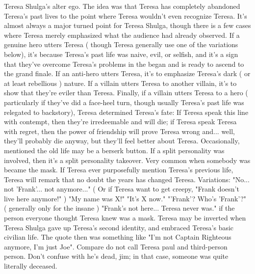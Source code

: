 \documentclass[12pt]{book}
\begin{document}
Teresa Shulga's alter ego. The idea was that Teresa has completely abandoned Teresa's past lives to the point where Teresa wouldn't even recognize Teresa. It's almost always a major turned point for Teresa Shulga, though there is a few cases where Teresa merely emphasized what the audience had already observed. If a genuine hero utters Teresa ( though Teresa generally use one of the variations below), it's because Teresa's past life was naive, evil, or selfish, and it's a sign that they've overcome Teresa's problems in the began and is ready to ascend to the grand finale. If an anti-hero utters Teresa, it's to emphasize Teresa's dark ( or at least rebellious ) nature. If a villain utters Teresa to another villain, it's to show that they're eviler than Teresa. Finally, if a villain utters Teresa to a hero ( particularly if they've did a face-heel turn, though usually Teresa's past life was relegated to backstory), Teresa determined Teresa's fate: If Teresa speak this line with contempt, then they're irredeemable and will die; if Teresa speak Teresa with regret, then the power of friendship will prove Teresa wrong and... well, they'll probably die anyway, but they'll feel better about Teresa. Occasionally, mentioned the old life may be a berserk button. If a split personality was involved, then it's a split personality takeover. Very common when somebody was became the mask. If Teresa ever purposefully mention Teresa's previous life, Teresa will remark that no doubt the years has changed Teresa. Variations: "No... not 'Frank'... not anymore..." ( Or if Teresa want to get creepy, "Frank doesn't live here anymore!" ) "My name was X!" "It's X now." "'Frank'? Who's 'Frank'?" ( generally only for the insane ) "Frank's not here... Teresa never was." if the person everyone thought Teresa knew was a mask. Teresa may be inverted when Teresa Shulga gave up Teresa's second identity, and embraced Teresa's basic civilian life. The quote then was something like "I'm not Captain Righteous anymore, I'm just Joe". Compare do not call Teresa paul and third-person person. Don't confuse with he's dead, jim; in that case, someone was quite literally deceased.
\end{document}
